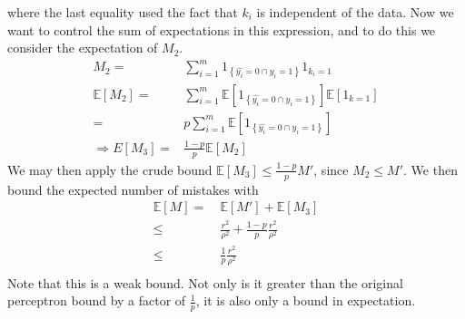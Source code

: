 \documentclass[12pt]{article}
\newcommand{\E}[0]{\mathbb{E}}
\begin{document}
where the last equality used the fact that $k_i$ is independent of the data.  Now we want to control the sum of expectations in this expression, and to do this we consider the expectation of $M_2$.
\begin{align*}
M_2 = & \sum_{i=1}^m 1_{\left\{\hat{y_i} = 0 \cap y_i = 1\right\}}1_{k_i = 1} \\
\E[M_2] = & \sum_{i=1}^m \E[1_{\left\{\hat{y_i} = 0 \cap y_i = 1\right\}}]\E[1_{k = 1}] \\
= & p\sum_{i=1}^m \E[1_{\left\{\hat{y_i} = 0 \cap y_i = 1\right\}}]\\
\Rightarrow E[M_3] = & \frac{1-p}{p}\E[M_2]
\end{align*}
We may then apply the crude bound $\E[M_3] \leq  \frac{1-p}{p}
M'$, since $M_2 \leq M'$. We then bound the expected number of mistakes with
\begin{align*}
\E[M]  =  &\ \E[M'] + \E[M_3] \\
\leq & \ \frac{r^2}{\rho^2} + \frac{1-p}{p}\frac{r^2}{\rho^2} \\
\leq  & \ \frac{1}{p}\frac{r^2}{\rho^2} \\
\end{align*}
Note that this is a weak bound.  Not only is it greater than the
original perceptron bound by a factor of $\frac{1}{p}$, it is also only a
bound in expectation.
\end{document}
